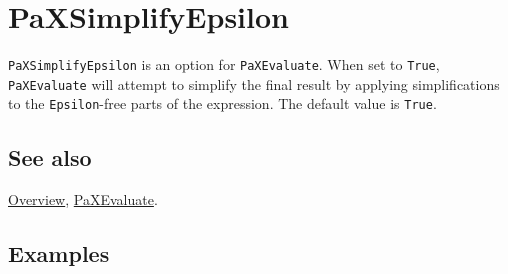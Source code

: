 \documentclass[../FeynHelpersManual.tex]{subfiles}
\begin{document}
\hypertarget{paxsimplifyepsilon}{
\section{PaXSimplifyEpsilon}\label{paxsimplifyepsilon}}

\texttt{PaXSimplifyEpsilon} is an option for \texttt{PaXEvaluate}. When
set to \texttt{True}, \texttt{PaXEvaluate} will attempt to simplify the
final result by applying simplifications to the \texttt{Epsilon}-free
parts of the expression. The default value is \texttt{True}.

\subsection{See also}

\hyperlink{toc}{Overview}, \hyperlink{paxevaluate}{PaXEvaluate}.

\subsection{Examples}
\end{document}
